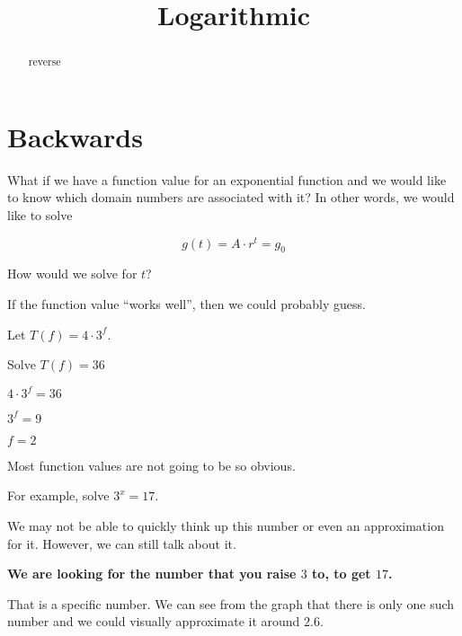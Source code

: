 \documentclass{ximera}
\title{Logarithmic}
\begin{document}
\begin{abstract}
reverse
\end{abstract}
\maketitle







\section*{Backwards}

What if we have a function value for an exponential function and we would like to know which domain numbers are associated with it?  In other words, we would like to solve


\[    g(t) = A \cdot r^t  =   g_0    \]


How would we solve for $t$?






\begin{example} If the function value ``works well'', then we could probably guess.

Let $T(f) = 4 \cdot 3^f$.  


Solve $T(f) = 36$

$4 \cdot 3^f = 36$

$3^f = 9$

$f = 2$

\end{example}









Most function values are not going to be so obvious. 


For example, solve $ 3^x = 17$.


We may not be able to quickly think up this number or even an approximation for it.  However, we can still talk about it.

\begin{center}

\textbf{\textcolor{purple!85!blue}{We are looking for the number that you raise $3$ to, to get $17$.}}

\end{center}


That is a specific number. We can see from the graph that there is only one such number and we could visually approximate it around $2.6$.
\end{document}
